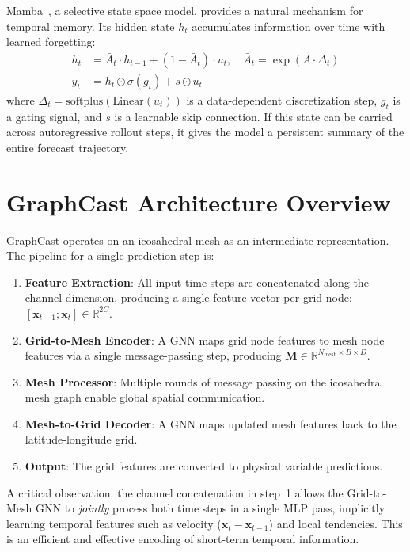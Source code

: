 \documentclass[11pt,a4paper]{article}
\begin{document}
Mamba~\cite{gu2023mamba}, a selective state space model, provides a natural mechanism for temporal memory. Its hidden state $h_t$ accumulates information over time with learned forgetting:
\begin{align}
    h_t &= \bar{A}_t \cdot h_{t-1} + (1 - \bar{A}_t) \cdot u_t, \quad \bar{A}_t = \exp(A \cdot \Delta_t) \label{eq:ssm} \\
    y_t &= h_t \odot \sigma(g_t) + s \odot u_t \label{eq:output}
\end{align}
where $\Delta_t = \text{softplus}(\text{Linear}(u_t))$ is a data-dependent discretization step, $g_t$ is a gating signal, and $s$ is a learnable skip connection. If this state can be carried across autoregressive rollout steps, it gives the model a persistent summary of the entire forecast trajectory.

\section{GraphCast Architecture Overview}

GraphCast operates on an icosahedral mesh as an intermediate representation. The pipeline for a single prediction step is:

\begin{enumerate}[nosep]
    \item \textbf{Feature Extraction}: All input time steps are concatenated along the channel dimension, producing a single feature vector per grid node: $[\mathbf{x}_{t-1}; \mathbf{x}_t] \in \mathbb{R}^{2C}$.
    \item \textbf{Grid-to-Mesh Encoder}: A GNN maps grid node features to mesh node features via a single message-passing step, producing $\mathbf{M} \in \mathbb{R}^{N_\text{mesh} \times B \times D}$.
    \item \textbf{Mesh Processor}: Multiple rounds of message passing on the icosahedral mesh graph enable global spatial communication.
    \item \textbf{Mesh-to-Grid Decoder}: A GNN maps updated mesh features back to the latitude-longitude grid.
    \item \textbf{Output}: The grid features are converted to physical variable predictions.
\end{enumerate}

A critical observation: the channel concatenation in step~1 allows the Grid-to-Mesh GNN to \emph{jointly} process both time steps in a single MLP pass, implicitly learning temporal features such as velocity ($\mathbf{x}_t - \mathbf{x}_{t-1}$) and local tendencies. This is an efficient and effective encoding of short-term temporal information.
\end{document}
